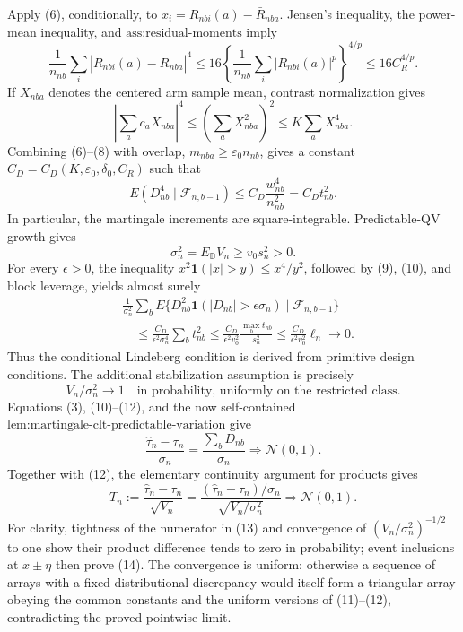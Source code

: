Apply (6), conditionally, to \(x_i=R_{nbi}(a)-\bar R_{nba}\). Jensen's inequality, the power-mean inequality, and \(\text{ass:residual-moments}\) imply
\[
\frac1{n_{nb}}\sum_i|R_{nbi}(a)-\bar R_{nba}|^4
\le16\left\{\frac1{n_{nb}}\sum_i|R_{nbi}(a)|^p\right\}^{4/p}
\le16C_R^{4/p}.
\tag{7}
\]
If \(X_{nba}\) denotes the centered arm sample mean, contrast normalization gives
\[
\left|\sum_ac_aX_{nba}\right|^4
\le\left(\sum_aX_{nba}^2\right)^2\le K\sum_aX_{nba}^4.
\tag{8}
\]
Combining (6)--(8) with overlap, \(m_{nba}\ge\varepsilon_0n_{nb}\), gives a constant \(C_D=C_D(K,\varepsilon_0,\delta_0,C_R)\) such that
\[
E(D_{nb}^4\mid\mathcal F_{n,b-1})
\le C_D\frac{w_{nb}^4}{n_{nb}^2}=C_Dt_{nb}^2.
\tag{9}
\]
In particular, the martingale increments are square-integrable. Predictable-QV growth gives
\[
\sigma_n^2=E_{\mathbb D}V_n\ge v_0s_n^2>0.
\tag{10}
\]
For every \(\epsilon>0\), the inequality
\(x^2\mathbf1(|x|>y)\le x^4/y^2\), followed by (9), (10), and block leverage, yields almost surely
\[
\begin{aligned}
&\frac1{\sigma_n^2}\sum_bE\{D_{nb}^2\mathbf1(|D_{nb}|>\epsilon\sigma_n)
\mid\mathcal F_{n,b-1}\}\\
&\quad\le\frac{C_D}{\epsilon^2\sigma_n^4}\sum_bt_{nb}^2
\le\frac{C_D}{\epsilon^2v_0^2}\frac{\max_bt_{nb}}{s_n^2}
\le\frac{C_D}{\epsilon^2v_0^2}\ell_n\longrightarrow0.
\end{aligned}
\tag{11}
\]
Thus the conditional Lindeberg condition is derived from primitive design conditions. The additional stabilization assumption is precisely
\[
V_n/\sigma_n^2\longrightarrow1
\quad\text{in probability, uniformly on the restricted class}.
\tag{12}
\]
Equations (3), (10)--(12), and the now self-contained
\(\text{lem:martingale-clt-predictable-variation}\) give
\[
\frac{\widehat\tau_n-\tau_n}{\sigma_n}
=\frac{\sum_bD_{nb}}{\sigma_n}\Rightarrow\mathcal N(0,1).
\tag{13}
\]
Together with (12), the elementary continuity argument for products gives
\[
T_n:=\frac{\widehat\tau_n-\tau_n}{\sqrt{V_n}}
=\frac{(\widehat\tau_n-\tau_n)/\sigma_n}{\sqrt{V_n/\sigma_n^2}}
\Rightarrow\mathcal N(0,1).
\tag{14}
\]
For clarity, tightness of the numerator in (13) and convergence of
\((V_n/\sigma_n^2)^{-1/2}\) to one show their product difference tends to zero in probability; event inclusions at \(x\pm\eta\) then prove (14). The convergence is uniform: otherwise a sequence of arrays with a fixed distributional discrepancy would itself form a triangular array obeying the common constants and the uniform versions of (11)--(12), contradicting the proved pointwise limit.

